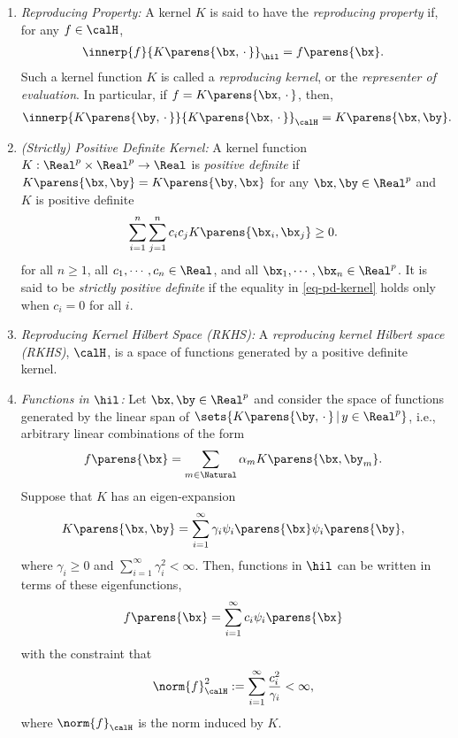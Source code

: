 \documentclass[12pt]{article}
\begin{document}
\begin{enumerate}[label=\textbf{\arabic*.}]
\begin{enumerate}
		\item \textit{Reproducing Property:} A kernel $K$ is said to have the \textit{reproducing property} if, for any $f \in \calH$, 
		\begin{align*}
			\innerp{f}{K \parens{\bx, \,\cdot\,} }_{\hil} = f \parens{\bx}. 
		\end{align*}
		Such a kernel function $K$ is called a \emph{reproducing kernel}, or the \textit{representer of evaluation}. In particular, if $f = K \parens{\bx, \,\cdot\,}$, then, 
		\begin{align*}
			\innerp{K \parens{\by, \,\cdot\,} }{K \parens{\bx, \,\cdot\,}}_{\calH} = K \parens{\bx, \by}. 
		\end{align*}
		
		\item \textit{(Strictly) Positive Definite Kernel:} A kernel function $K: \Real^p \times \Real^p \to \Real$ is \emph{positive definite} if $K \parens{\bx, \by} = K \parens{\by, \bx}$ for any $\bx, \by \in \Real^p$ and $K$ is positive definite
		\begin{equation}\label{eq-pd-kernel}
			\sum_{i=1}^n \sum_{j=1}^n c_i c_j K \parens{\bx_i, \bx_j} \ge 0.
		\end{equation}
		for all $n \ge 1$, all $c_1, \cdots, c_n \in \Real$, and all $\bx_1, \cdots, \bx_n \in \Real^p$. It is said to be \emph{strictly positive definite} if the equality in \eqref{eq-pd-kernel} holds only when $c_i = 0$ for all $i$. 
		
		\item \textit{Reproducing Kernel Hilbert Space (RKHS):} A \emph{reproducing kernel Hilbert space (RKHS)}, $\calH$, is a space of functions generated by a positive definite kernel. 
		
		\item \textit{Functions in $\hil$:} Let $\bx, \by \in \Real^p$ and consider the space of functions generated by the linear span of $\sets{K \parens{\by, \,\cdot\,} \,\vert\, y \in \Real^p}$, i.e., arbitrary linear combinations of the form
		\begin{align*}
			f \parens{\bx} = \sum_{m \in \Natural} \alpha_m K \parens{\bx, \by_m}. 
		\end{align*}
		Suppose that $K$ has an eigen-expansion 
		\begin{align*}
			K \parens{\bx, \by} = \sum_{i=1}^\infty \gamma_i \psi_i \parens{\bx} \psi_i \parens{\by}, 
		\end{align*}
		where $\gamma_i \ge 0$ and $\sum_{i=1}^\infty \gamma_i^2 < \infty$. Then, functions in $\hil$ can be written in terms of these eigenfunctions, 
		\begin{align*}
			f \parens{\bx} = \sum_{i=1}^\infty c_i \psi_i \parens{\bx} 
		\end{align*}
		with the constraint that 
		\begin{align*}
			\norm{f}_{\calH}^2 := \sum_{i=1}^\infty \frac{c_i^2}{\gamma_i} < \infty, 
		\end{align*}
		where $\norm{f}_{\calH}$ is the norm induced by $K$. 
	\end{enumerate}
	

\end{enumerate}
\end{document}
